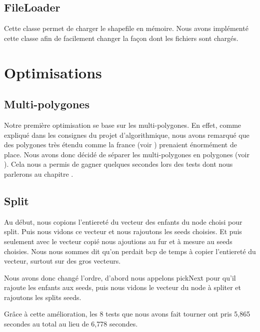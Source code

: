 \documentclass[utf8]{article}
\begin{document}
\begin{large}
  \subsection{FileLoader}
  \indent
  \par
  Cette classe permet de charger le shapefile en mémoire. Nous avons implémenté
  cette classe afin de facilement changer la façon dont les fichiers sont chargés.


  \section{Optimisations}
  \subsection{Multi-polygones}
  \indent
  \par
  Notre première optimisation se base sur les multi-polygones. En effet, comme
  expliqué dans les consignes du projet d'algorithmique, nous avons remarqué que
  des polygones très étendu comme la france (voir )
  prenaient énormément de place. Nous avons donc décidé de séparer les
  multi-polygones en polygones (voir ). Cela nous a
  permis de gagner quelques secondes lors des tests dont nous parlerons au
  chapitre .

  \subsection{Split}
  \indent

  \par
  Au début, nous copions l'entiereté du vecteur des enfants du node choisi pour
  split. Puis nous vidons ce vecteur et nous rajoutons les seeds choisies. Et puis
  seulement avec le vecteur copié nous ajoutions au fur et à mesure au seeds
  choisies. Nous nous sommes dit qu'on perdait bcp de temps à copier l'entiereté
  du vecteur, surtout sur des gros vecteurs.

  Nous avons donc changé l'ordre, d'abord nous appelons pickNext pour qu'il
  rajoute les enfants aux seeds, puis nous vidons le vecteur du node à spliter et
  rajoutons les splits seeds.

  Grâce à cette amélioration, les 8 tests que nous avons fait tourner ont pris
  5,865 secondes au total au lieu de 6,778 secondes.
  \par

\end{large}
\end{document}

